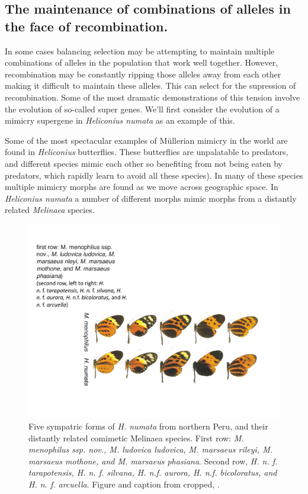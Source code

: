 \subsection{The maintenance of combinations of alleles in the face of recombination.} \label{epistasis_inversion}

In some cases balancing selection may be attempting to maintain multiple combinations of alleles in the population that work well together. However, recombination may be constantly ripping those alleles away from each other making it difficult to maintain these alleles. This can select for the supression of recombination. Some of the most dramatic demonstrations of this tension involve the evolution of so-called super genes. We'll first consider the evolution of a mimicry supergene in {\it Heliconius numata} as an example of this.  

Some of the most spectacular examples of M{\"u}llerian mimicry in the world are found in {\it Heliconius} butterflies. These butterflies are unpalatable to predators, and different species mimic each other so benefiting from not being eaten by predators, which rapidly learn to avoid all these species). In many of these species multiple mimicry morphs are found as we move across geographic space. In  {\it Heliconius numata} a number of different morphs mimic morphs from a distantly related {\it Melinaea} species. 

\begin{figure} %
\begin{center}
  \includegraphics[width = \textwidth]{Journal_figs/recom_selection/H_numata/H_numata.pdf}
\end{center}
\caption{Five sympatric forms of {\it H. numata} from northern Peru, and their distantly related comimetic Melinaea species.  First row: {\it M. menophilus ssp. nov., M. ludovica ludovica, M. marsaeus rileyi, M. marsaeus mothone, and M. marsaeus phasiana}. Second row, {\it H. n. f. tarapotensis, H. n. f. silvana, H. n.f. aurora, H. n.f. bicoloratus, and H. n. f. arcuella}. Figure and caption from \citet{joron2006conserved} cropped, \PLOSccBY. } \label{}  %
\end{figure}

